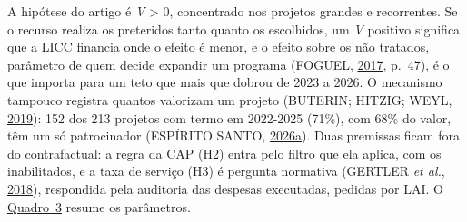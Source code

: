 \documentclass[12pt,a4paper]{article}
\begin{document}
A hipótese do artigo é \emph{V} \textgreater{} 0, concentrado nos projetos grandes e recorrentes. Se
o recurso realiza os preteridos tanto quanto os escolhidos, um \emph{V} positivo significa que a
LICC financia onde o efeito é menor, e o efeito sobre os não tratados, parâmetro de quem decide
expandir um programa (FOGUEL, \hyperref[ref-foguel-18]{2017}, p.~47), é o que importa para um teto
que mais que dobrou de 2023 a 2026. O mecanismo tampouco registra quantos valorizam um projeto
(BUTERIN; HITZIG; WEYL, \hyperref[ref-buterin-7]{2019}): 152 dos 213 projetos com termo em 2022-2025
(71\%), com 68\% do valor, têm um só patrocinador (ESPÍRITO SANTO,
\hyperref[ref-espirito-14]{2026a}). Duas premissas ficam fora do contrafactual: a regra da CAP (H2)
entra pelo filtro que ela aplica, com os inabilitados, e a taxa de serviço (H3) é pergunta normativa
(GERTLER \emph{et al.}, \hyperref[ref-gertler-20]{2018}), respondida pela auditoria das despesas
executadas, pedidas por LAI. O \hyperref[quadro-3]{Quadro~3} resume os parâmetros.
\end{document}
